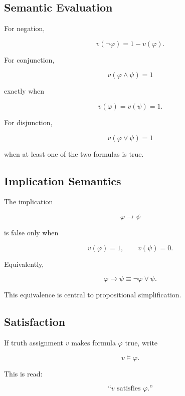 \subsection{Semantic Evaluation}
\label{subsec:propositional-semantic-evaluation}

For negation,

\[
\boxed{
v(\neg\varphi)
=
1-v(\varphi).
}
\]

For conjunction,

\[
\boxed{
v(\varphi\land\psi)=1
}
\]

exactly when

\[
v(\varphi)=v(\psi)=1.
\]

For disjunction,

\[
\boxed{
v(\varphi\lor\psi)=1
}
\]

when at least one of the two formulas is true.

\subsection{Implication Semantics}
\label{subsec:formal-implication-semantics}

The implication

\[
\varphi\rightarrow\psi
\]

is false only when

\[
\boxed{
v(\varphi)=1,
\qquad
v(\psi)=0.
}
\]

Equivalently,

\[
\boxed{
\varphi\rightarrow\psi
\equiv
\neg\varphi\lor\psi.
}
\]

This equivalence is central to propositional simplification.

\subsection{Satisfaction}
\label{subsec:propositional-satisfaction}

If truth assignment \(v\) makes formula \(\varphi\) true, write

\[
\boxed{
v\models\varphi.
}
\]

This is read:

\[
\boxed{
\text{``\(v\) satisfies \(\varphi\).''}
}
\]


